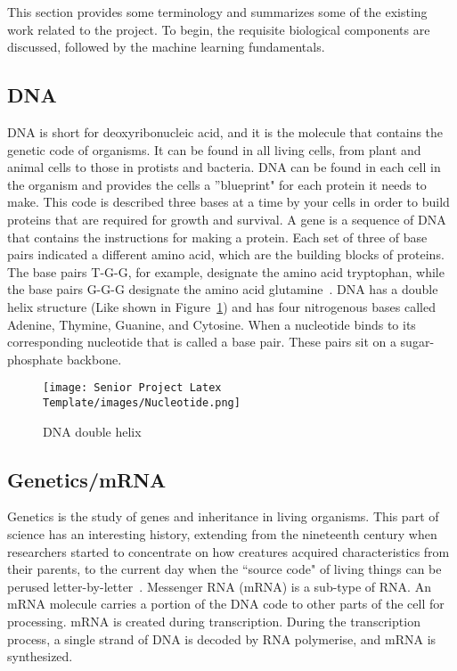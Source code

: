 \documentclass[12pt,letterpaper,oneside,reqno]{book}
\theoremstyle{plain}
\theoremstyle{definition}
\theoremstyle{plain}
\theoremstyle{remark}
\theoremstyle{plain}
\theoremstyle{definition}
\theoremstyle{plain}
\begin{document}
This section provides some terminology and summarizes some of the existing work related to the project. To begin, the requisite biological components are discussed, followed by the machine learning fundamentals.

\subsection{DNA} %
DNA is short for deoxyribonucleic acid, and it is the molecule that contains the genetic code of organisms. It can be found in all living cells, from plant and animal cells to those in protists and bacteria.%
DNA can be found in each cell in the organism and provides the cells a ''blueprint" for each protein it needs to make. This code is described three bases at a time by your cells in order to build proteins that are required for growth and survival. A gene is a sequence of DNA that contains the instructions for making a protein. Each set of three of base pairs indicated a different amino acid, which are the building blocks of proteins. The base pairs T-G-G, for example, designate the amino acid tryptophan, while the base pairs G-G-G designate the amino acid glutamine~\cite{Murrell19}. DNA has a double helix structure (Like shown in Figure~\ref{fig:Nucleotide}) and has four nitrogenous bases called Adenine, Thymine, Guanine, and Cytosine. When a nucleotide binds to its corresponding nucleotide that is called a base pair. These pairs sit on a sugar-phosphate backbone.
\begin{figure}[H]
    \centering
    \texttt{[image: Senior Project Latex Template/images/Nucleotide.png]}
    \caption{DNA double helix}
    \label{fig:Nucleotide}
\end{figure}
\subsection{Genetics/mRNA}
Genetics is the study of genes and inheritance in living organisms. This part of science has an interesting history, extending from the nineteenth century when researchers started to concentrate on how creatures acquired characteristics from their parents, to the current day when the ``source code" of living things can be perused letter-by-letter~\cite{Toomey13}.
Messenger RNA (mRNA) is a sub-type of RNA. An mRNA molecule carries a portion of the DNA code to other parts of the cell for processing. mRNA is created during transcription. During the transcription process, a single strand of DNA is decoded by RNA polymerise, and mRNA is synthesized.
\end{document}
